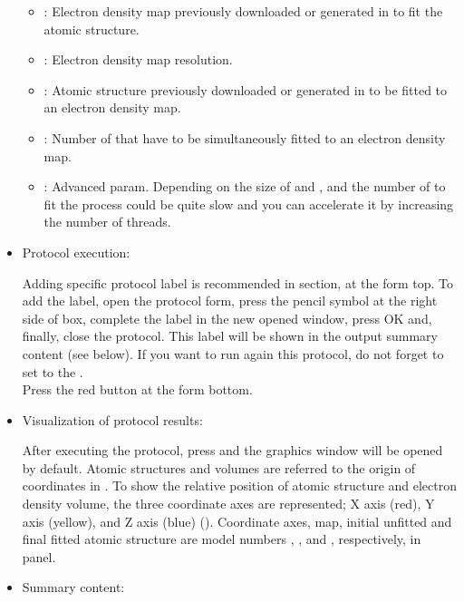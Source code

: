 \begin{itemize}
    \begin{itemize}
     \item {}: Electron density map previously downloaded or generated in \scipion to fit the atomic structure.
     \item {}: Electron density map resolution.
     \item {}: Atomic structure previously downloaded or generated in \scipion to be fitted to an electron density map.
     \item {}: Number of  that have to be simultaneously fitted to an electron density map.
     \item {}: Advanced param. Depending on the size of  and , and the number of  to fit the process could be quite slow and you can accelerate it by increasing the number of threads.
    \end{itemize}

  \item Protocol execution:
  
  Adding specific protocol label is recommended in  section, at the form top. To add the label, open the protocol form, press the pencil symbol at the right side of  box, complete the label in the new opened window, press OK and, finally, close the protocol. This label will be shown in the output summary content (see below). If you want to run again this protocol, do not forget to set to  the .\\
  Press the  red button at the form bottom.
  
  \item Visualization of protocol results:
  
  After executing the protocol, press  and the \chimera graphics window will be opened by default. Atomic structures and volumes are referred to the origin of coordinates in \chimera. To show the relative position of atomic structure and electron density volume, the three coordinate axes are represented; X axis (red), Y axis (yellow), and Z axis (blue) (). Coordinate axes, map, initial unfitted  and final fitted atomic structure are model numbers , ,  and , respectively, in \chimera {} panel. 

   
  \item Summary content:
  

\end{itemize}
